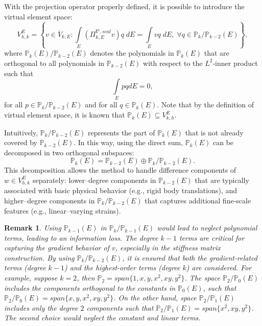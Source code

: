 \documentclass{article}
\newtheorem{rem}{Remark}[section]
\begin{document}
With the projection operator properly defined, it is possible to introduce the virtual element space:
\begin{equation}\label{eq:ve_space}
    V_{h,k}^E = \left\{ v \in \overline{V}_{k,E} : \int \limits_E \left( \Pi^{\nabla, scal}_{k,E} v \right) q\;dE= \int \limits_E vq \; dE, \; \forall q \in \mathbb{P}_k/\mathbb{P}_{k-2}(E) \right\},
\end{equation}
where $\mathbb{P}_k(E)/\mathbb{P}_{k-2}(E)$ denotes the polynomials in $\mathbb{P}_k(E)$ that are orthogonal to all polynomials in $\mathbb{P}_{k-2}(E)$ with respect to the $L^2$-inner product such that
\begin{equation}
    \nonumber
    \int \limits_E pq dE = 0,
\end{equation}
for all $p \in \mathbb{P}_k/\mathbb{P}_{k-2}(E)$ and for all $q \in \mathbb{P}_k(E)$. Note that by the definition of virtual element space, it is known that $\mathbb{P}_k(E) \subseteq V^E_{k,h}$.

Intuitively, $\mathbb{P}_k/\mathbb{P}_{k-2}(E)$ represents the part of $\mathbb{P}_k(E)$ that is not already covered by $\mathbb{P}_{k-2}(E)$. In this way, using the direct sum, $\mathbb{P}_k(E)$ can be decomposed in two orthogonal subspaces:
\begin{equation}
    \nonumber
    \mathbb{P}_k(E) = \mathbb{P}_{k-2}(E) \oplus \mathbb{P}_k/\mathbb{P}_{k-2}(E).
\end{equation}
This decomposition allows the method to handle difference components of $w \in V^E_{h,k}$ separately: lower--degree components in $\mathbb{P}_{k-2}(E)$ that are typically associated with basic physical behavior (e.g., rigid body translations), and higher--degree components in $\mathbb{P}_k/\mathbb{P}_{k-2}(E)$ that captures additional fine-scale features (e.g., linear--varying strains).

\begin{rem}
    Using $\mathbb{P}_{k-1}(E)$ in $\mathbb{P}_k/\mathbb{P}_{k-1}(E)$ would lead to  neglect polynomial terms, leading to an information loss. The degree $k-1$ terms are critical for capturing the gradient behavior of $v$, especially in the stiffness matrix construction. By using $\mathbb{P}_k/\mathbb{P}_{k-2}(E)$, it is ensured that both the gradient-related terms (degree $k-1$) and the highest-order terms (degree $k$) are considered. For example, suppose $k=2$, then $\mathbb{P}_{2} = span \{ 1, x, y, x^2, xy, y^2 \}$. The space $\mathbb{P}_2/\mathbb{P}_0(E)$ includes the components orthogonal to the constants in $\mathbb{P}_0(E)$, such that $\mathbb{P}_2/\mathbb{P}_0(E)=span\{ x, y, x^2, xy,  y^2 \}$. On the other hand, space $\mathbb{P}_2/ \mathbb{P}_1 (E)$ includes only the degree $2$ components such that $\mathbb{P}_2/\mathbb{P}_1(E) = span \{ x^2, xy, y^2 \}$. The second choice would neglect the constant and linear terms.
\end{rem}
\end{document}
